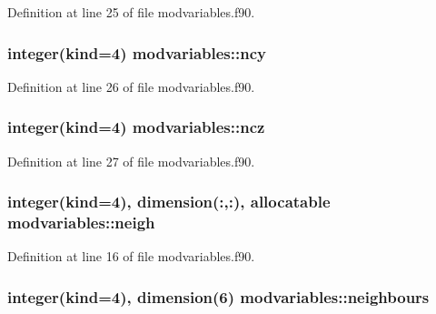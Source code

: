 Definition at line 25 of file modvariables.\+f90.

\subsubsection[{\texorpdfstring{ncy}{ncy}}]{\setlength{\rightskip}{0pt plus 5cm}integer(kind=4) modvariables\+::ncy}\hypertarget{namespacemodvariables_a1c1ff1a91ab25fd963a4ce5302249978}{}\label{namespacemodvariables_a1c1ff1a91ab25fd963a4ce5302249978}


Definition at line 26 of file modvariables.\+f90.

\subsubsection[{\texorpdfstring{ncz}{ncz}}]{\setlength{\rightskip}{0pt plus 5cm}integer(kind=4) modvariables\+::ncz}\hypertarget{namespacemodvariables_ab75f9f5dd0ce07892cca908373a51ddc}{}\label{namespacemodvariables_ab75f9f5dd0ce07892cca908373a51ddc}


Definition at line 27 of file modvariables.\+f90.

\subsubsection[{\texorpdfstring{neigh}{neigh}}]{\setlength{\rightskip}{0pt plus 5cm}integer(kind=4), dimension(\+:,\+:), allocatable modvariables\+::neigh}\hypertarget{namespacemodvariables_a8602ecbf617fcd3d1c712a4ace68843c}{}\label{namespacemodvariables_a8602ecbf617fcd3d1c712a4ace68843c}


Definition at line 16 of file modvariables.\+f90.

\subsubsection[{\texorpdfstring{neighbours}{neighbours}}]{\setlength{\rightskip}{0pt plus 5cm}integer(kind=4), dimension(6) modvariables\+::neighbours}\hypertarget{namespacemodvariables_ad84b74b636d64be51d7aba857b4b5c05}{}\label{namespacemodvariables_ad84b74b636d64be51d7aba857b4b5c05}


